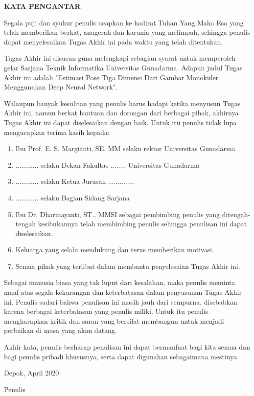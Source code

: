 \newpage %
\begin{center}
\begin{large}\textbf{KATA PENGANTAR}\\\end{large}
\end{center}
\vspace{5mm}


Segala puji dan syukur penulis ucapkan ke hadirat Tuhan Yang Maha Esa yang telah memberikan berkat, 
anugerah dan karunia yang melimpah, sehingga penulis dapat menyelesaikan Tugas Akhir ini pada waktu 
yang telah ditentukan.

Tugas Akhir ini disusun guna melengkapi sebagian syarat untuk memperoleh gelar Sarjana Teknik 
Informatika Universitas Gunadarma. Adapun judul Tugas Akhir ini adalah "Estimasi Pose Tiga Dimensi
Dari Gambar Monokuler Menggunakan Deep Neural Network".

Walaupun banyak kesulitan yang penulis harus hadapi ketika menyusun Tugas Akhir ini, namun berkat 
bantuan dan dorongan dari berbagai pihak, akhirnya Tugas Akhir ini dapat diselesaikan dengan baik. 
Untuk itu penulis tidak lupa mengucapkan terima kasih kepada:

\begin{enumerate}
  \item Ibu Prof. E. S. Margianti, SE, MM selaku rektor Universitas Gunadarma
  \item ............ selaku Dekan Fakultas ........ Universitas Gunadarma
  \item ............ selaku Ketua Jurusan ..............
  \item ............ selaku Bagian Sidang Sarjana
  \item Ibu Dr. Dharmayanti, ST., MMSI sebagai pembimbing penulis yang ditengah-tengah kesibukannya 
  telah membimbing penulis sehingga penulisan ini dapat diselesaikan.
  \item Keluarga yang selalu mendukung dan terus memberikan motivasi.
  \item Semua pihak yang terlibat dalam membantu penyelesaian Tugas Akhir ini.

\end{enumerate}

Sebagai manusia biasa yang tak luput dari kesalahan, maka penulis meminta maaf atas segala 
kekurangan dan keterbatasan dalam penyusunan Tugas Akhir ini. Penulis sadari bahwa penulisan ini 
masih jauh dari sempurna, disebabkan karena berbagai keterbatasan yang penulis miliki. Untuk itu 
penulis mengharapkan kritik dan saran yang bersifat membangun untuk menjadi perbaikan di masa yang 
akan datang.

Akhir kata, penulis berharap penulisan ini dapat bermanfaat bagi kita semua dan bagi penulis 
pribadi khususnya, serta dapat digunakan sebagaimana mestinya.


\vspace{0.5 cm}
\begin{flushright}
Depok, April 2020

\vspace{2 cm}
Penulis
\end{flushright}
